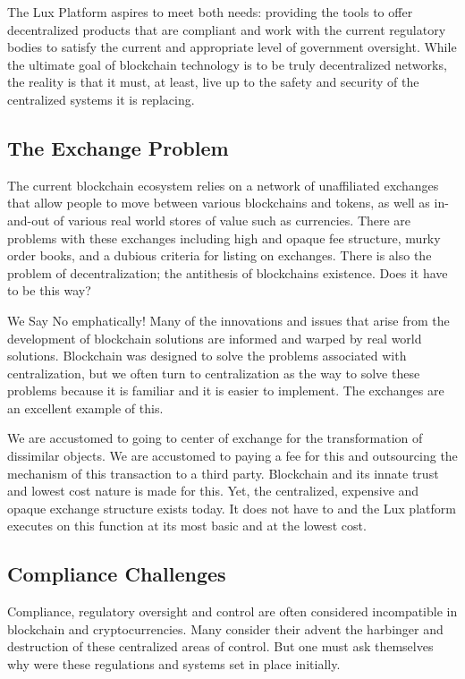 \documentclass[11pt]{article}
\begin{document}
The Lux Platform aspires to meet both needs: providing the tools to offer decentralized products that are compliant and work with the current regulatory bodies to satisfy the current and appropriate level of government oversight. While the ultimate goal of blockchain technology is to be truly decentralized networks, the reality is that it must, at least, live up to the safety and security of the centralized systems it is replacing.


\subsection{The Exchange Problem}

The current blockchain ecosystem relies on a network of unaffiliated exchanges that allow people to move between various blockchains and tokens, as well as in-and-out of various real world stores of value such as currencies. There are problems with these exchanges including high and opaque fee structure, murky order books, and a dubious criteria for listing on exchanges. There is also the problem of decentralization; the antithesis of blockchains existence.  Does it have to be this way?


We Say No emphatically! Many of the innovations and issues that arise from the development of blockchain solutions are informed and warped by real world solutions. Blockchain was designed to solve the problems associated with centralization, but we often turn to centralization as the way to solve these problems because it is familiar and it is easier to implement. The exchanges are an excellent example of this.


We are accustomed to going to center of exchange for the transformation of dissimilar objects. We are accustomed to paying a fee for this and outsourcing the mechanism of this transaction to a third party. Blockchain and its innate trust and lowest cost nature is made for this.  Yet, the centralized, expensive and opaque exchange structure exists today. It does not have to and the Lux platform executes on this function at its most basic and at the lowest cost.


\subsection{Compliance Challenges}

Compliance, regulatory oversight and control are often considered incompatible in blockchain and cryptocurrencies. Many consider their advent the harbinger and destruction of these centralized areas of control. But one must ask themselves why were these regulations and systems set in place initially.
\end{document}
